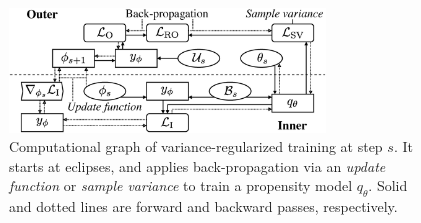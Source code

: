 \documentclass[letterpaper]{article} %
\newcommand{\propensityName}{q}
\newcommand{\propensityParam}{\theta}
\newcommand{\step}{s}
\begin{document}
\begin{figure}[t]
\centering
\includegraphics[width=8.4cm]{fig/ltd.eps}
\caption{
  Computational graph of variance-regularized training at step $\step$.
  It starts at eclipses, and applies back-propagation via an \emph{update function} or \emph{sample variance} to train a propensity model $\propensityName_\propensityParam$.
  Solid and dotted lines are forward and backward passes, respectively.
}
\label{fig:computational graph}
\end{figure}%
\end{document}
